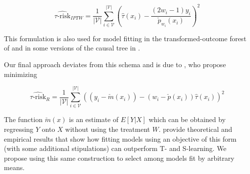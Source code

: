 \begin{equation}
\widehat{\tau\text{-risk}}_{IPTW} = 
	\frac{1}{|\mathcal{V}|}\sum_{i \in \mathcal{V}}^{|\mathcal{V}|}  
	\left(\hat \tau (x_i) - \frac{(2w_i -1)y_i}{\check p_{w_i}(x_i)}\right)^2
\label{trisk-iptw}
\end{equation}

This formulation is also used for model fitting in the transformed-outcome forest of \citet{Powers:2017wd} and in some versions of the causal tree in \citet{Athey2015}.

Our final approach deviates from this schema and is due to \citet{Nie:2017vi}, who propose minimizing

\begin{equation}
\widehat{\tau\text{-risk}}_{R} = 
	\frac{1}{|\mathcal{V}|}\sum_{i \in \mathcal{V}}^{|\mathcal{V}|}  
	((y_i - \check m(x_i)) - (w_i - \check p(x_i))\hat\tau (x_i))^2
\label{trisk-r}
\end{equation}

The function $\check m(x)$ is an estimate of $E[Y|X]$ which can be obtained by regressing $Y$ onto $X$ without using the treatment $W$. \citet{Nie:2017vi} provide theoretical and empirical results that show how fitting models using an objective of this form (with some additional stipulations) can outperform T- and S-learning. We propose using this same construction to select among models fit by arbitrary means.

